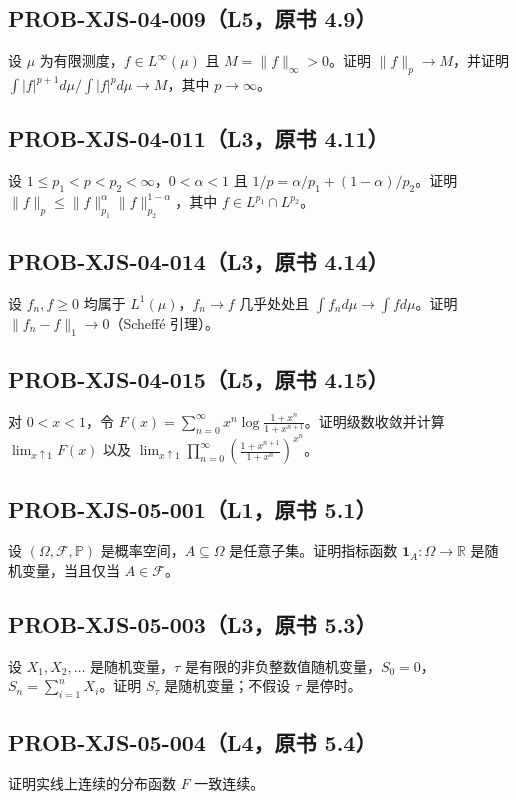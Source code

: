\documentclass[UTF8]{ctexart}
\begin{document}
\subsection*{PROB-XJS-04-009（L5，原书 4.9）}
设 $\mu$ 为有限测度，$f\in L^\infty(\mu)$ 且 $M=\|f\|_\infty>0$。证明 $\|f\|_p\to M$，并证明 $\int |f|^{p+1}d\mu/\int |f|^p d\mu\to M$，其中 $p\to\infty$。

\subsection*{PROB-XJS-04-011（L3，原书 4.11）}
设 $1\le p_1<p<p_2<\infty$，$0<\alpha<1$ 且 $1/p=\alpha/p_1+(1-\alpha)/p_2$。证明 $\|f\|_p\le\|f\|_{p_1}^{\alpha}\|f\|_{p_2}^{1-\alpha}$，其中 $f\in L^{p_1}\cap L^{p_2}$。

\subsection*{PROB-XJS-04-014（L3，原书 4.14）}
设 $f_n,f\ge0$ 均属于 $L^1(\mu)$，$f_n\to f$ 几乎处处且 $\int f_n d\mu\to\int f d\mu$。证明 $\|f_n-f\|_1\to0$（Scheffé 引理）。

\subsection*{PROB-XJS-04-015（L5，原书 4.15）}
对 $0<x<1$，令 $F(x)=\sum_{n=0}^{\infty}x^n\log\frac{1+x^n}{1+x^{n+1}}$。证明级数收敛并计算 $\lim_{x\uparrow1}F(x)$ 以及 $\lim_{x\uparrow1}\prod_{n=0}^{\infty}\left(\frac{1+x^{n+1}}{1+x^n}\right)^{x^n}$。

\subsection*{PROB-XJS-05-001（L1，原书 5.1）}
设 $(\Omega,\mathcal F,\mathbb P)$ 是概率空间，$A\subseteq\Omega$ 是任意子集。证明指标函数 $\mathbf1_A:\Omega\to\mathbb R$ 是随机变量，当且仅当 $A\in\mathcal F$。

\subsection*{PROB-XJS-05-003（L3，原书 5.3）}
设 $X_1,X_2,\ldots$ 是随机变量，$\tau$ 是有限的非负整数值随机变量，$S_0=0$，$S_n=\sum_{i=1}^nX_i$。证明 $S_\tau$ 是随机变量；不假设 $\tau$ 是停时。

\subsection*{PROB-XJS-05-004（L4，原书 5.4）}
证明实线上连续的分布函数 $F$ 一致连续。
\end{document}
